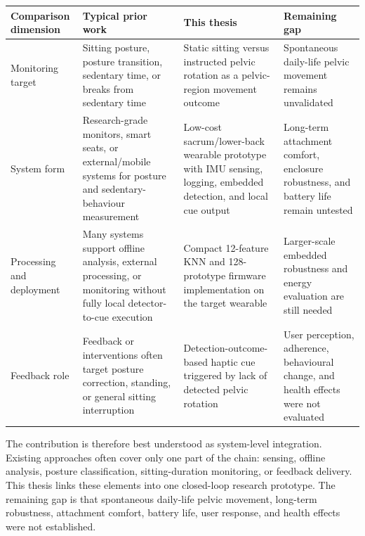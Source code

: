 \begin{strip}
    \centering
    \scriptsize
    \label{tab:discussion_literature_comparison}
    \begin{tabularx}{\textwidth}{@{}p{}p{}p{}X@{}}
        \toprule
        Comparison dimension & Typical prior work & This thesis & Remaining gap \\
        \midrule
        Monitoring target & Sitting posture, posture transition, sedentary time, or breaks from sedentary time \cite{grant2006activpal_validation,obrien2022activpal_posture_review,lyden2012breaks_sedentary_monitors} & Static sitting versus instructed pelvic rotation as a pelvic-region movement outcome & Spontaneous daily-life pelvic movement remains unvalidated \\
        System form & Research-grade monitors, smart seats, or external/mobile systems for posture and sedentary-behaviour measurement \cite{ishac2018lifechair,kalisch2022waist_thigh_sedentary,liao2026imu_pelvic_rotation} & Low-cost sacrum/lower-back wearable prototype with IMU sensing, logging, embedded detection, and local cue output & Long-term attachment comfort, enclosure robustness, and battery life remain untested \\
        Processing and deployment & Many systems support offline analysis, external processing, or monitoring without fully local detector-to-cue execution \cite{chastin2010objective_sedentary,byrom2016objective_sedentary_accelerometers,figueira2024work_postural_feedback_review} & Compact 12-feature KNN and 128-prototype firmware implementation on the target wearable & Larger-scale embedded robustness and energy evaluation are still needed \\
        Feedback role & Feedback or interventions often target posture correction, standing, or general sitting interruption \cite{gopalai2011vibrotactile_posture_system,gill2018sitfit_feedback_validation,stephenson2017technology_sedentary_meta} & Detection-outcome-based haptic cue triggered by lack of detected pelvic rotation & User perception, adherence, behavioural change, and health effects were not evaluated \\
        \bottomrule
    \end{tabularx}
    \vspace{0.6em}
\end{strip}

The contribution is therefore best understood as system-level integration. Existing approaches often cover only one part of the chain: sensing, offline analysis, posture classification, sitting-duration monitoring, or feedback delivery. This thesis links these elements into one closed-loop research prototype. The remaining gap is that spontaneous daily-life pelvic movement, long-term robustness, attachment comfort, battery life, user response, and health effects were not established.

